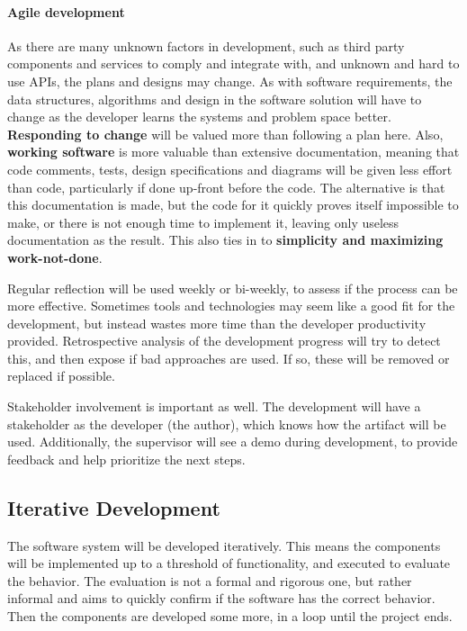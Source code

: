 \paragraph{Agile development}
As there are many unknown factors in development, such as third party components and services to comply and integrate with, and unknown and hard to use \glspl{API}, the plans and designs may change.
As with software requirements, the data structures, algorithms and design in the software solution will have to change as the developer learns the systems and problem space better.
\textbf{Responding to change} will be valued more than following a plan here.
Also, \textbf{working software} is more valuable than extensive documentation, meaning that code comments, tests, design specifications and diagrams will be given less effort than code, particularly if done up-front before the code.
The alternative is that this documentation is made, but the code for it quickly proves itself impossible to make, or there is not enough time to implement it, leaving only useless documentation as the result.
This also ties in to \textbf{simplicity and maximizing work-not-done}.


Regular reflection will be used weekly or bi-weekly, to assess if the process can be more effective.
Sometimes tools and technologies may seem like a good fit for the development, but instead wastes more time than the developer productivity provided.
Retrospective analysis of the development progress will try to detect this, and then expose if bad approaches are used.
If so, these will be removed or replaced if possible.


Stakeholder involvement is important as well.
The development will have a stakeholder as the developer (the author), which knows how the artifact will be used.
Additionally, the supervisor will see a demo during development, to provide feedback and help prioritize the next steps.


\subsection{Iterative Development}

The software system will be developed iteratively.
This means the components will be implemented up to a threshold of functionality, and executed to evaluate the behavior.
The evaluation is not a formal and rigorous one, but rather informal and aims to quickly confirm if the software has the correct behavior.
Then the components are developed some more, in a loop until the project ends.


